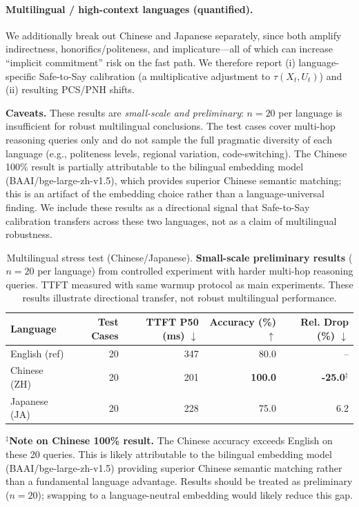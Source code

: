 \documentclass[11pt]{article}
\begin{document}
\paragraph{Multilingual / high-context languages (quantified).}
We additionally break out Chinese and Japanese separately, since both amplify indirectness, honorifics/politeness, and implicature---all of which can increase ``implicit commitment'' risk on the fast path.
We therefore report (i) language-specific Safe-to-Say calibration (a multiplicative adjustment to $\tau(X_t,U_t)$) and (ii) resulting PCS/PNH shifts.

\noindent\textbf{Caveats.} These results are \emph{small-scale and preliminary}: $n{=}20$ per language is insufficient for robust multilingual conclusions. The test cases cover multi-hop reasoning queries only and do not sample the full pragmatic diversity of each language (e.g., politeness levels, regional variation, code-switching). The Chinese 100\% result is partially attributable to the bilingual embedding model (BAAI/bge-large-zh-v1.5), which provides superior Chinese semantic matching; this is an artifact of the embedding choice rather than a language-universal finding. We include these results as a directional signal that Safe-to-Say calibration transfers across these two languages, not as a claim of multilingual robustness.

\begin{table}[t]
  \caption{Multilingual stress test (Chinese/Japanese). \textbf{Small-scale preliminary results} ($n{=}20$ per language) from controlled experiment with harder multi-hop reasoning queries. TTFT measured with same warmup protocol as main experiments. These results illustrate directional transfer, not robust multilingual performance.}
  \label{tab:multilingual-calib}
  \centering
  \begin{tabular}{lrrrr}
    \toprule
    Language & Test Cases & TTFT P50 (ms) $\downarrow$ & Accuracy (\%) $\uparrow$ & Rel. Drop (\%) $\downarrow$ \\
    \midrule
    English (ref) & 20 & 347 & 80.0 & -- \\
    Chinese (ZH) & 20 & 201 & \textbf{100.0} & \textbf{-25.0}$^\ddagger$ \\
    Japanese (JA) & 20 & 228 & 75.0 & 6.2 \\
    \bottomrule
  \end{tabular}
\end{table}

\noindent\textbf{$^\ddagger$Note on Chinese 100\% result.} The Chinese accuracy exceeds English on these 20 queries. This is likely attributable to the bilingual embedding model (BAAI/bge-large-zh-v1.5) providing superior Chinese semantic matching rather than a fundamental language advantage. Results should be treated as preliminary ($n{=}20$); swapping to a language-neutral embedding would likely reduce this gap.
\end{document}
